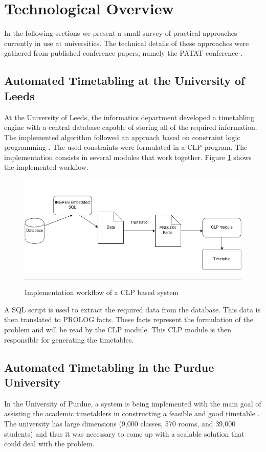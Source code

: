 \section{Technological Overview}

In the following sections we present a small survey of practical approaches currently in use at universities. The technical details of these approaches were gathered from published conference papers, namely the PATAT conference
\citep{leed_clp, purdue_patat_2006, bullet_paper, thor, distributed_timetabling, online_tt_patat2010, diamant}.  

\subsection{Automated Timetabling at the University of Leeds}
At the University of Leeds, the informatics department developed a timetabling engine with a central database capable of storing all of the required information. The implemented algorithm followed an approach based on constraint logic programming \citep{leed_clp}. The used constraints were  formulated in a CLP program.
The implementation consists in several modules that work together. Figure \ref{fig:leeds_workflow} shows the implemented workflow.
\begin{figure}[htbp]
	\centering
		\includegraphics[width=\textwidth]{./Figures/leed_workflow.png}
		\rule{35em}{0.5pt}
	\caption[Implementation workflow of a CLP based system]{Implementation workflow of a CLP based system}
	\label{fig:leeds_workflow}
\end{figure}
 
A SQL script is used to extract the required data from the database. This data is then translated to PROLOG facts. These facts represent the formulation of the problem and will be read by the CLP module. This CLP module is then responsible for generating the timetables.

\subsection{Automated Timetabling in the Purdue University}
In the University of Purdue, a system is being implemented with the main goal of assisting the academic timetablers in constructing a feasible and good timetable \citep{purdue_patat_2006}. The university has large dimensions (9,000 classes, 570 rooms, and 39,000 students) and thus it was necessary to come up with a scalable solution that could deal with the problem.

